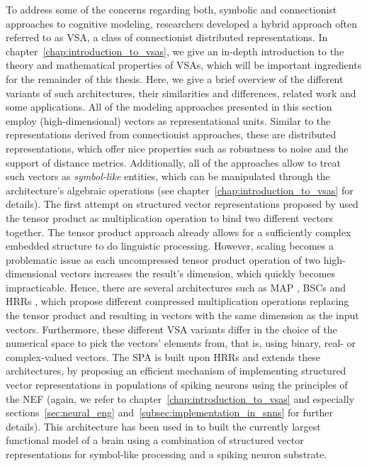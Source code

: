 To address some of the concerns regarding both, symbolic and connectionist approaches to cognitive modeling, researchers developed a hybrid approach often referred to as \acf{VSA}, a class of connectionist distributed representations.
In chapter~\ref{chap:introduction_to_vsas}, we give an in-depth introduction to the theory and mathematical properties of \acp{VSA}, which will be important ingredients for the remainder of this thesis.
Here, we give a brief overview of the different variants of such architectures, their similarities and differences, related work and some applications.
All of the modeling approaches presented in this section employ (high-dimensional) vectors as representational units.
Similar to the representations derived from connectionist approaches, these are distributed representations, which offer nice properties such as robustness to noise and the support of distance metrics.
Additionally, all of the approaches allow to treat such vectors as \emph{symbol-like} entities, which can be manipulated through the architecture's algebraic operations (see chapter~\ref{chap:introduction_to_vsas} for details).
The first attempt on structured vector representations proposed by \textcite{Smolensky1990} used the tensor product as multiplication operation to bind two different vectors together.
The tensor product approach already allows for a sufficiently complex embedded structure to do linguistic processing.
However, scaling becomes a problematic issue as each uncompressed tensor product operation of two high-dimensional vectors increases the result's dimension, which quickly becomes impracticable.
Hence, there are several architectures such as \ac{MAP} \parencite{Gayler1998, Gayler2003}, \acp{BSC} \parencite{Kanerva1988} and \acp{HRR} \parencite{Plate1991, Plate1994}, which propose different compressed multiplication operations replacing the tensor product and resulting in vectors with the same dimension as the input vectors.
Furthermore, these different \ac{VSA} variants differ in the choice of the numerical space to pick the vectors' elements from, that is, using binary, real- or complex-valued vectors. 
The \ac{SPA} \parencite{Eliasmith2013} is built upon \acp{HRR} and extends these architectures, by proposing an efficient mechanism of implementing structured vector representations in populations of spiking neurons using the principles of the \ac{NEF} \parencite{Eliasmith2003} (again, we refer to chapter~\ref{chap:introduction_to_vsas} and especially sections~\ref{sec:neural_eng} and~\ref{subsec:implementation_in_snns} for further details).   
This architecture has been used in \textcite{Eliasmith2012} to built the currently largest functional model of a brain using a combination of structured vector representations for symbol-like processing and a spiking neuron substrate.

